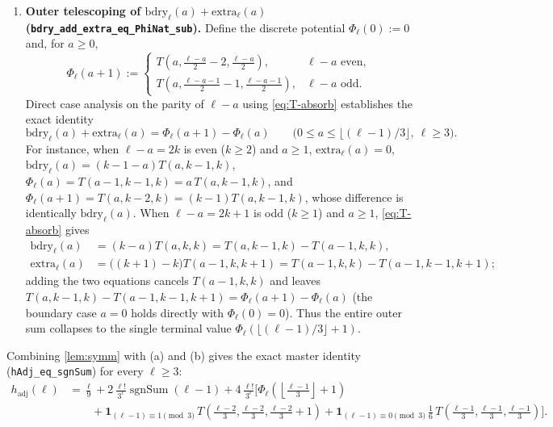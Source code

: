 \documentclass[11pt,a4paper]{article}
\numberwithin{equation}{section}
\theoremstyle{plain}
\theoremstyle{definition}
\theoremstyle{remark}
\newcommand{\hadj}{h_{\mathrm{adj}}}
\newcommand{\code}[1]{\texttt{\small #1}}
\begin{document}
\begin{enumerate}[label=(\alph*)]
  \item \textbf{Outer telescoping of $\mathrm{bdry}_\ell(a)+\mathrm{extra}_\ell(a)$ (\code{bdry\_add\_extra\_eq\_PhiNat\_sub}).} Define the discrete potential $\Phi_\ell(0):=0$ and, for $a\ge 0$,
  \[
    \Phi_\ell(a+1) := \begin{cases}
      T\!\left(a,\frac{\ell-a}{2}-2,\frac{\ell-a}{2}\right), & \ell-a \text{ even},\\[0.4em]
      T\!\left(a,\frac{\ell-a-1}{2}-1,\frac{\ell-a-1}{2}\right), & \ell-a \text{ odd}.
    \end{cases}
  \]
  Direct case analysis on the parity of $\ell-a$ using \eqref{eq:T-absorb} establishes the exact identity
  \[
    \mathrm{bdry}_\ell(a) + \mathrm{extra}_\ell(a) = \Phi_\ell(a+1) - \Phi_\ell(a)
    \qquad \bigl(0\le a\le \lfloor(\ell-1)/3\rfloor,\ \ell\ge 3\bigr).
  \]
  For instance, when $\ell-a=2k$ is even ($k\ge 2$) and $a\ge 1$, $\mathrm{extra}_\ell(a)=0$, $\mathrm{bdry}_\ell(a)=(k-1-a)T(a,k-1,k)$, $\Phi_\ell(a)=T(a-1,k-1,k)=a\,T(a,k-1,k)$, and $\Phi_\ell(a+1)=T(a,k-2,k)=(k-1)T(a,k-1,k)$, whose difference is identically $\mathrm{bdry}_\ell(a)$. When $\ell-a=2k+1$ is odd ($k\ge 1$) and $a\ge 1$, \eqref{eq:T-absorb} gives
  \begin{align*}
    \mathrm{bdry}_\ell(a) &= (k-a)T(a,k,k) = T(a,k-1,k) - T(a-1,k,k),\\
    \mathrm{extra}_\ell(a) &= \bigl((k+1)-k\bigr)T(a-1,k,k+1) = T(a-1,k,k) - T(a-1,k-1,k+1);
  \end{align*}
  adding the two equations cancels $T(a-1,k,k)$ and leaves $T(a,k-1,k)-T(a-1,k-1,k+1)=\Phi_\ell(a+1)-\Phi_\ell(a)$ (the boundary case $a=0$ holds directly with $\Phi_\ell(0)=0$). Thus the entire outer sum collapses to the single terminal value $\Phi_\ell(\lfloor(\ell-1)/3\rfloor+1)$.
\end{enumerate}

Combining \cref{lem:symm} with (a) and (b) gives the exact master identity (\code{hAdj\_eq\_sgnSum}) for every $\ell\ge 3$:
\begin{align}\label{eq:master-sgnSum}
  \hadj(\ell)
  &= \frac{\ell}{9} + 2\,\frac{\ell!}{3^\ell}\operatorname{sgnSum}(\ell-1)
   + 4\,\frac{\ell!}{3^\ell}\Biggl[\Phi_\ell\!\left(\left\lfloor\frac{\ell-1}{3}\right\rfloor+1\right)\nonumber\\
  &\qquad + \mathbf{1}_{(\ell-1)\equiv 1\pmod 3}\,T\!\left(\tfrac{\ell-2}{3},\tfrac{\ell-2}{3},\tfrac{\ell-2}{3}+1\right)
   + \mathbf{1}_{(\ell-1)\equiv 0\pmod 3}\,\frac{1}{6}\,T\!\left(\tfrac{\ell-1}{3},\tfrac{\ell-1}{3},\tfrac{\ell-1}{3}\right)\Biggr].
\end{align}
\end{document}
